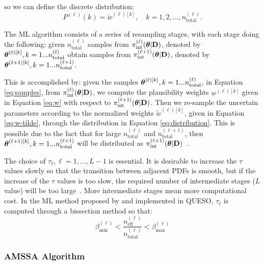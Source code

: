 so we can define the discrete distribution:
\begin{equation}
 \label{eq:distribution}
 P^{(\ell)}(k) = \tilde{w}^{(\ell) [k]} , \quad k=1,2,\ldots, n_\text{total}^{(\ell)}.
\end{equation}


The ML algorithm consists of a series of resampling stages, with each stage
doing the following: given $n_\text{total}^{(\ell)}$ samples from
$\pi_\text{int}^{(\ell)} (\mbox{\boldmath$ \theta $}|{\bf D})$, denoted by
$\mbox{\boldmath$ \theta $}^{(\ell)[k]}, k=1...n_\text{total}^{(\ell)}$ obtain samples from
$\pi_\text{int}^{(\ell+1)} (\mbox{\boldmath$ \theta $}|{\bf D})$, denoted by
$\mbox{\boldmath$ \theta $}^{(\ell+1)[k]}, k=1...n_\text{total}^{(\ell+1)}$. 

This is accomplished by: given the samples
$\mbox{\boldmath$ \theta $}^{(\ell)[k]}, k=1...n_\text{total}^{(\ell)}$, in Equation \eqref{eq:samples}, from
$\pi_\text{int}^{(\ell)} (\mbox{\boldmath$ \theta $}|{\bf D})$, we compute the plausibility weights
$w^{(\ell) [k]}$ given in Equation \eqref{eq:w} with respect to
$\pi_\text{int}^{(\ell+1)} (\mbox{\boldmath$ \theta $}|{\bf D})$. Then we re-sample the uncertain
parameters according to the normalized weights $\tilde{w}^{(\ell) [k]}$, given
in Equation \eqref{eq:w-tilde}, through the distribution in Equation
\eqref{eq:distribution}. This is possible due to the fact that for large
$n_\text{total}^{(\ell)}$ and $n_\text{total}^{(\ell+1)}$, then
$\mbox{\boldmath$ \theta $}^{(\ell+1)[k]}, k=1...n_\text{total}^{(\ell+1)}$ will be
distributed as $\pi_\text{int}^{(\ell+1)}
(\mbox{\boldmath$ \theta $}|{\bf D})$~\cite{ChingChen2007}.

The choice of $\tau_\ell, \ell=1,\ldots,L-1$ is essential. It is desirable to
increase the $\tau$ values slowly so that the transition between adjacent PDFs
is smooth, but if the increase of the $\tau$ values is too slow, the required
number of intermediate stages ($L$ value) will be too
large~\cite{ChingChen2007}. More intermediate stages mean more computational
cost.  In the ML method proposed by \cite{CheungPrudencio2012} and implemented
in QUESO, $\tau_\ell$ is computed through a bissection method so that:
\begin{equation}\label{eq:tau}
\beta_\text{min}^{(\ell)}<\dfrac{n_\text{eff}^{(\ell)}}{n_\text{total}^{(\ell)}} <\beta_\text{max}^{(\ell)}
\end{equation}


\subsubsection{AMSSA Algorithm}


